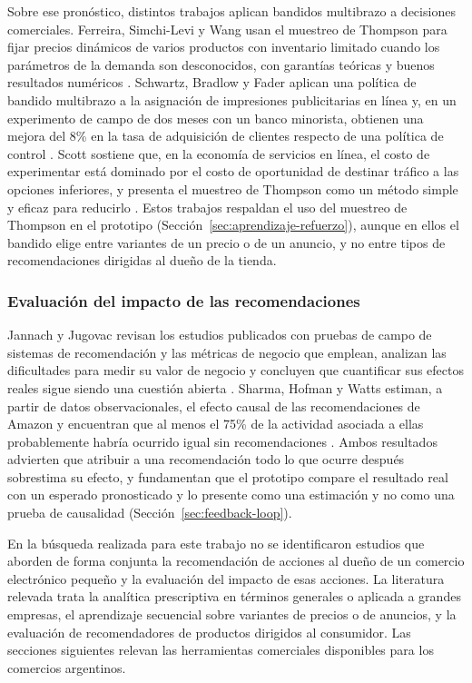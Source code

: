 Sobre ese pronóstico, distintos trabajos aplican bandidos multibrazo a decisiones comerciales. Ferreira, Simchi-Levi y Wang usan el muestreo de Thompson para fijar precios dinámicos de varios productos con inventario limitado cuando los parámetros de la demanda son desconocidos, con garantías teóricas y buenos resultados numéricos \parencite{Ferreira2018}. Schwartz, Bradlow y Fader aplican una política de bandido multibrazo a la asignación de impresiones publicitarias en línea y, en un experimento de campo de dos meses con un banco minorista, obtienen una mejora del 8\% en la tasa de adquisición de clientes respecto de una política de control \parencite{Schwartz2017}. Scott sostiene que, en la economía de servicios en línea, el costo de experimentar está dominado por el costo de oportunidad de destinar tráfico a las opciones inferiores, y presenta el muestreo de Thompson como un método simple y eficaz para reducirlo \parencite{Scott2015}. Estos trabajos respaldan el uso del muestreo de Thompson en el prototipo (Sección~\ref{sec:aprendizaje-refuerzo}), aunque en ellos el bandido elige entre variantes de un precio o de un anuncio, y no entre tipos de recomendaciones dirigidas al dueño de la tienda.

\subsubsection{Evaluación del impacto de las recomendaciones}
\label{sec:antecedentes-impacto}

Jannach y Jugovac revisan los estudios publicados con pruebas de campo de sistemas de recomendación y las métricas de negocio que emplean, analizan las dificultades para medir su valor de negocio y concluyen que cuantificar sus efectos reales sigue siendo una cuestión abierta \parencite{Jannach2019}. Sharma, Hofman y Watts estiman, a partir de datos observacionales, el efecto causal de las recomendaciones de Amazon y encuentran que al menos el 75\% de la actividad asociada a ellas probablemente habría ocurrido igual sin recomendaciones \parencite{Sharma2015}. Ambos resultados advierten que atribuir a una recomendación todo lo que ocurre después sobrestima su efecto, y fundamentan que el prototipo compare el resultado real con un esperado pronosticado y lo presente como una estimación y no como una prueba de causalidad \parencite{Brodersen2015} (Sección~\ref{sec:feedback-loop}).

En la búsqueda realizada para este trabajo no se identificaron estudios que aborden de forma conjunta la recomendación de acciones al dueño de un comercio electrónico pequeño y la evaluación del impacto de esas acciones. La literatura relevada trata la analítica prescriptiva en términos generales o aplicada a grandes empresas, el aprendizaje secuencial sobre variantes de precios o de anuncios, y la evaluación de recomendadores de productos dirigidos al consumidor. Las secciones siguientes relevan las herramientas comerciales disponibles para los comercios argentinos.

